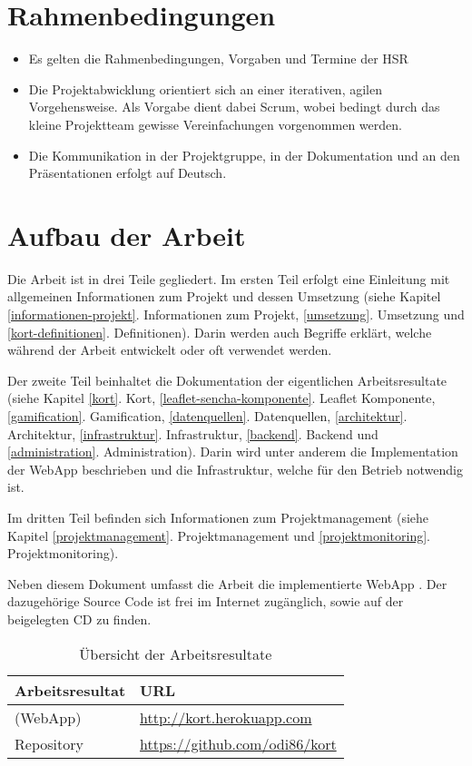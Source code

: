 \section{Rahmenbedingungen}
\begin{itemize}
\item Es gelten die Rahmenbedingungen, Vorgaben und Termine der HSR
\item Die Projektabwicklung orientiert sich an einer iterativen, agilen Vorgehensweise. Als Vorgabe dient dabei Scrum, wobei bedingt durch das kleine Projektteam gewisse Vereinfachungen vorgenommen werden.
\item Die Kommunikation in der Projektgruppe, in der Dokumentation und an den Präsentationen erfolgt auf Deutsch.
\end{itemize}

\section{Aufbau der Arbeit}
Die Arbeit ist in drei Teile gegliedert. Im ersten Teil erfolgt eine Einleitung mit allgemeinen Informationen zum Projekt und dessen Umsetzung (siehe Kapitel \ref{informationen-projekt}. Informationen zum Projekt, \ref{umsetzung}. Umsetzung und \ref{kort-definitionen}. Definitionen). Darin werden auch Begriffe erklärt, welche während der Arbeit entwickelt oder oft verwendet werden.

Der zweite Teil beinhaltet die Dokumentation der eigentlichen Arbeitsresultate (siehe Kapitel \ref{kort}. Kort, \ref{leaflet-sencha-komponente}. Leaflet Komponente, \ref{gamification}. Gamification, \ref{datenquellen}. Datenquellen, \ref{architektur}. Architektur, \ref{infrastruktur}. Infrastruktur, \ref{backend}. Backend und \ref{administration}. Administration). Darin wird unter anderem die Implementation der \gls{WebApp} beschrieben und die Infrastruktur, welche für den Betrieb notwendig ist.

Im dritten Teil befinden sich Informationen zum Projektmanagement (siehe Kapitel \ref{projektmanagement}. Projektmanagement und \ref{projektmonitoring}. Projektmonitoring).

Neben diesem Dokument umfasst die Arbeit die implementierte \gls{WebApp} \kort{}. Der dazugehörige Source Code ist frei im Internet zugänglich, sowie auf der beigelegten CD zu finden.

\begin{table}[H]
\centering
\begin{tabular}{|p{0.3\twocelltabwidth}|p{0.7\twocelltabwidth}|}
\hline 
\textbf{Arbeitsresultat} & \textbf{URL} \\ 
\hline 
\kort{} (\gls{WebApp}) & \url{http://kort.herokuapp.com} \\ 
\hline 
Repository & \url{https://github.com/odi86/kort} \\ 
\hline 
\end{tabular}
\label{arbeitsresultate}
\caption{Übersicht der Arbeitsresultate}
\end{table} 